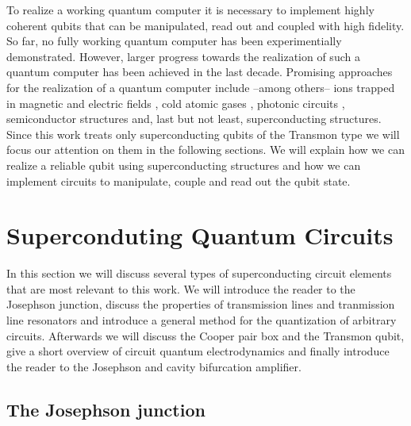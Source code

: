 To realize a working quantum computer it is necessary to implement highly coherent qubits that can be manipulated, read out and coupled with high fidelity. So far, no fully working quantum computer has been experimentially demonstrated. However, larger progress towards the realization of such a quantum computer has been achieved in the last decade. Promising approaches for the realization of a quantum computer include --among others-- ions trapped in magnetic and electric fields \citep{}, cold atomic gases \citep{}, photonic circuits \citep{}, semiconductor structures \citep{} and, last but not least, superconducting structures. Since this work treats only superconducting qubits of the Transmon type we will focus our attention on them in the following sections. We will explain how we can realize a reliable qubit using superconducting structures and how we can implement circuits to manipulate, couple and read out the qubit state.

\section{Superconduting Quantum Circuits}

In this section we will discuss several types of superconducting circuit elements that are most relevant to this work. We will introduce the reader to the Josephson junction, discuss the properties of transmission lines and tranmission line resonators and introduce a general method for the quantization of arbitrary circuits. Afterwards we will discuss the Cooper pair box and the Transmon qubit, give a short overview of circuit quantum electrodynamics and finally introduce the reader to the Josephson and cavity bifurcation amplifier.

\subsection{The Josephson junction}

